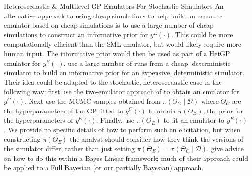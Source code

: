 \begin{chapter}{Heteroscedastic \& Multilevel GP Emulators For Stochastic Simulators\label{Ch:Hetsml}}
An alternative approach to using cheap simulations to help build an accurate emulator based on cheap simulations is to use a large number of cheap simulations to construct an informative prior for $y^E(\cdot)$. This could be more computationally efficient than the SML emulator, but would likely require more human input. The informative prior would then be used as part of a HetGP emulator for $y^E(\cdot)$. \citet{Cumming2010} use a large number of runs from a cheap, deterministic simulator to build an informative prior for an expensive, deterministic simulator. Their idea could be adapted to the stochastic, heteroscedastic case in the following way: first use the two-emulator approach of \citet{Henderson09} to obtain an emulator for $y^C(\cdot)$. Next use the MCMC samples obtained from $\pi(\Theta_C \mid \mathcal{D})$ where $\Theta_C$ are the hyperparameters of the GP fitted to $y^C(\cdot)$ to obtain $\pi(\Theta_E)$, the prior for the hyperparameters of $y^E (\cdot)$. Finally, use $\pi(\Theta_E)$ to fit an emulator to $y^E (\cdot)$. We provide no specific details of how to perform such an elicitation, but when constructing $\pi(\Theta_E)$ the analyst should consider how they think the versions of the simulator differ, rather than just setting $\pi(\Theta_E) = \pi(\Theta_C \mid \mathcal{D})$. \citet{Cumming2010} give advice on how to do this within a Bayes Linear framework; much of their approach could be applied to a Full Bayesian (or our partially Bayesian) approach.

\end{chapter}
